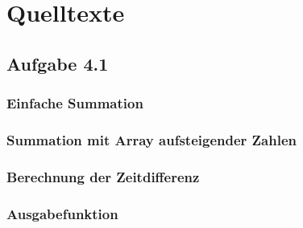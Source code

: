 \documentclass[a4paper,
12pt,
BCOR12mm,
]{scrartcl}
\begin{document}
\clearpage
\section{Quelltexte}
\subsection{Aufgabe 4.1}
\subsubsection{Einfache Summation}
\label{src:sum}

\subsubsection{Summation mit Array aufsteigender Zahlen}
\label{src:ascend}


\subsubsection{Berechnung der Zeitdifferenz}
\label{src:messure}



\subsubsection{Ausgabefunktion}
\label{src:basic}


\end{document}

